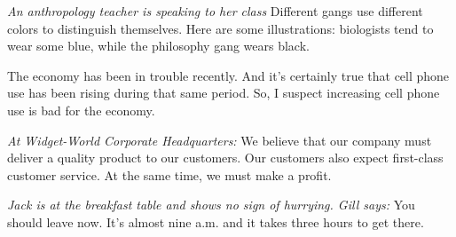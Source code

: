 \begin{exercises}
\item \textit{An anthropology teacher is speaking to her class }Different gangs use different colors to distinguish themselves. Here are some illustrations: biologists tend to wear some blue, while the philosophy gang wears black. 

\item The economy has been in trouble recently. And it's certainly true that cell phone use has been rising during that same period. So, I suspect increasing cell phone use is bad for the economy. 


\item \textit{At Widget-World Corporate Headquarters:} We believe that our company must deliver a quality product to our customers. Our customers also expect first-class customer service. At the same time, we must make a profit. 

      
\item \textit{Jack is at the breakfast table and shows no sign of hurrying. Gill says:} You should leave now. It's almost nine a.m. and it takes three hours to get there.

\end{exercises}

